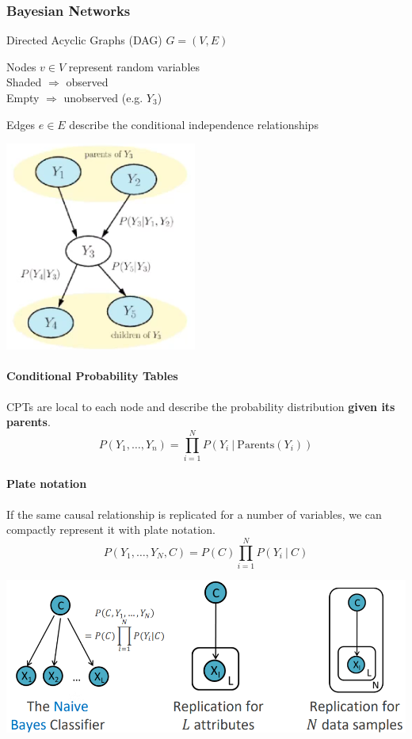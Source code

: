 \documentclass[10pt]{report}
\begin{document}
\subsubsection{Bayesian Networks} 
\begin{multicols}{2}
Directed Acyclic Graphs (DAG) $G = (V,E)$\begin{list}{}{}
	\item Nodes $v\in V$ represent random variables\\
	Shaded $\Rightarrow$ observed\\
	Empty $\Rightarrow$ unobserved (e.g. $Y_3$)
	\item Edges $e\in E$ describe the conditional independence relationships
\end{list}
\columnbreak
\begin{center}
	\includegraphics[scale=0.5]{15.png}
\end{center}
\end{multicols}
\paragraph{Conditional Probability Tables} CPTs are local to each node and describe the probability distribution \textbf{given its parents}.
$$P(Y_1,\ldots,Y_n) = \prod_{i=1}^N P(Y_i\:|\:\text{Parents}(Y_i))$$
\paragraph{Plate notation} If the same causal relationship is replicated for a number of variables, we can compactly represent it with plate notation.
$$P(Y_1,\ldots,Y_N,C) = P(C)\prod_{i=1}^N P(Y_i\:|\:C)$$
\begin{center}
	\includegraphics[scale=0.5]{16.png}
\end{center}
\pagebreak
\end{document}
